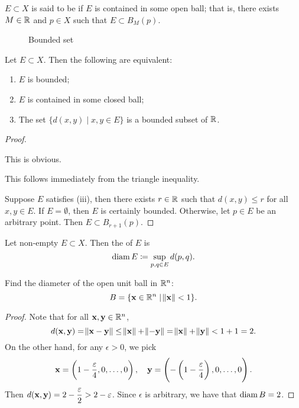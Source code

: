 \begin{definition}[Bounded]
$E\subset X$ is said to be  if $E$ is contained in some open ball; that is, there exists $M\in\mathbb R$ and $p\in X$ such that $E\subset B_M(p)$.
\end{definition}

\begin{figure}[H]
\centering
{}
\caption{Bounded set}
\end{figure}

\begin{proposition}
Let $E\subset X$. Then the following are equivalent:
\begin{enumerate}[label=(\roman*)]
\item $E$ is bounded;
\item $E$ is contained in some closed ball;
\item The set $\{d(x,y)\mid x,y\in E\}$ is a bounded subset of $\mathbb R$.
\end{enumerate}
\end{proposition}

\begin{proof} \

 This is obvious.

 This follows immediately from the triangle inequality.

 Suppose $E$ satisfies (iii), then there exists $r\in\mathbb R$ such that $d(x,y)\le r$ for all $x,y\in E$. If $E=\emptyset$, then $E$ is certainly bounded. Otherwise, let $p\in E$ be an arbitrary point. Then $E\subset B_{r+1}(p)$.
\end{proof}

\begin{definition}[Diameter]
Let non-empty $E\subset X$. Then the  of $E$ is
\[\operatorname{diam} E\coloneqq\sup_{p,q\in E}d(p,q).\]
\end{definition}

\begin{example}
Find the diameter of the open unit ball in $\mathbb R^n$:
\[B=\{\vb{x}\in\mathbb R^n\mid\norm{\vb{x}}<1\}. \]
\begin{proof}
Note that for all $\vb{x},\vb{y}\in\mathbb R^n$,
\[d(\vb{x},\vb{y})=\norm{\vb{x}-\vb{y}}\le\norm{\vb{x}}+\norm{-\vb{y}}=\norm{\vb{x}}+\norm{\vb{y}}<1+1=2. \]
On the other hand, for any $\epsilon>0$, we pick
\[\vb{x}=\left(1-\frac{\varepsilon}{4},0,\dots,0\right),\quad\vb{y}=\left(-\left(1-\frac{\varepsilon}{4}\right),0,\dots,0\right). \]
Then $d(\vb{x},\vb{y})=2-\dfrac{\varepsilon}{2}>2-\varepsilon$. Since $\epsilon$ is arbitrary, we have that $\operatorname{diam} B=2$.
\end{proof}
\end{example}

